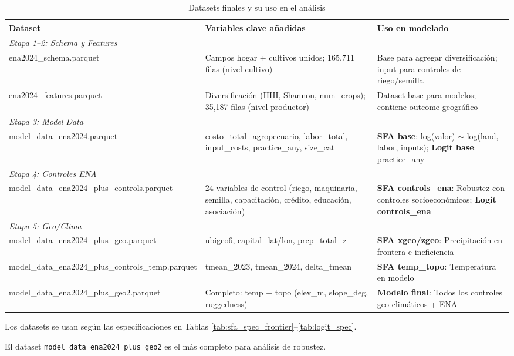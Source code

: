 \documentclass[11pt,a4paper]{article}
\begin{document}
\begin{table}[H]
\centering
\caption{Datasets finales y su uso en el análisis}
\label{tab:dataset_usage}
\begin{threeparttable}
\footnotesize
\begin{tabular}{p{4.5cm}p{4cm}p{5cm}}
\toprule
\textbf{Dataset} & \textbf{Variables clave añadidas} & \textbf{Uso en modelado} \\
\midrule
\multicolumn{3}{l}{\textit{Etapa 1--2: Schema y Features}} \\
ena2024\_schema.parquet & Campos hogar + cultivos unidos; 165,711 filas (nivel cultivo) & Base para agregar diversificación; input para controles de riego/semilla \\
ena2024\_features.parquet & Diversificación (HHI, Shannon, num\_crops); 35,187 filas (nivel productor) & Dataset base para modelos; contiene outcome geográfico \\
\midrule
\multicolumn{3}{l}{\textit{Etapa 3: Model Data}} \\
model\_data\_ena2024.parquet & costo\_total\_agropecuario, labor\_total, input\_costs, practice\_any, size\_cat & \textbf{SFA base}: log(valor) $\sim$ log(land, labor, inputs); \textbf{Logit base}: practice\_any \\
\midrule
\multicolumn{3}{l}{\textit{Etapa 4: Controles ENA}} \\
model\_data\_ena2024\_plus\_controls.parquet & 24 variables de control (riego, maquinaria, semilla, capacitación, crédito, educación, asociación) & \textbf{SFA controls\_ena}: Robustez con controles socioeconómicos; \textbf{Logit controls\_ena} \\
\midrule
\multicolumn{3}{l}{\textit{Etapa 5: Geo/Clima}} \\
model\_data\_ena2024\_plus\_geo.parquet & ubigeo6, capital\_lat/lon, prcp\_total\_z & \textbf{SFA xgeo/zgeo}: Precipitación en frontera e ineficiencia \\
model\_data\_ena2024\_plus\_controls\_temp.parquet & tmean\_2023, tmean\_2024, delta\_tmean & \textbf{SFA temp\_topo}: Temperatura en modelo \\
model\_data\_ena2024\_plus\_geo2.parquet & Completo: temp + topo (elev\_m, slope\_deg, ruggedness) & \textbf{Modelo final}: Todos los controles geo-climáticos + ENA \\
\bottomrule
\end{tabular}
\begin{tablenotes}
\footnotesize
\item Los datasets se usan según las especificaciones en Tablas \ref{tab:sfa_spec_frontier}--\ref{tab:logit_spec}.
\item El dataset \texttt{model\_data\_ena2024\_plus\_geo2} es el más completo para análisis de robustez.
\end{tablenotes}
\end{threeparttable}
\end{table}
\end{document}
